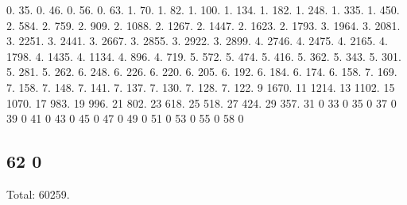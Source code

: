 0. 35. 0. 46. 0. 56. 0. 63. 1. 70. 1. 82. 1. 100. 1. 134. 1. 182. 1. 248. 1. 335. 1. 450. 2. 584. 2. 759. 2. 909. 2. 1088. 2. 1267. 2. 1447. 2. 1623. 2. 1793. 3. 1964. 3. 2081. 3. 2251. 3. 2441. 3. 2667. 3. 2855. 3. 2922. 3. 2899. 4. 2746. 4. 2475. 4. 2165. 4. 1798. 4. 1435. 4. 1134. 4. 896. 4. 719. 5. 572. 5. 474. 5. 416. 5. 362. 5. 343. 5. 301. 5. 281. 5. 262. 6. 248. 6. 226. 6. 220. 6. 205. 6. 192. 6. 184. 6. 174. 6. 158. 7. 169. 7. 158. 7. 148. 7. 141. 7. 137. 7. 130. 7. 128. 7. 122. 9 1670. 11 1214. 13 1102. 15 1070. 17 983. 19 996. 21 802. 23 618. 25 518. 27 424. 29 357. 31 0 33 0 35 0 37 0 39 0 41 0 43 0 45 0 47 0 49 0 51 0 53 0 55 0 58 0 \subsection*{62 0 }

Total\+: 60259. 
